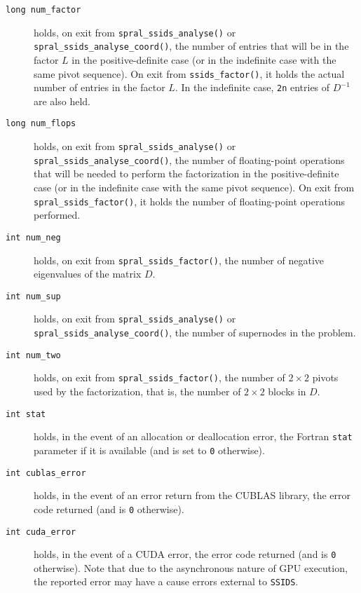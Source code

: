 \begin{description}
\item[\texttt{long num\_factor}] holds, on exit from
{\tt spral\_ssids\_analyse()}  or {\tt spral\_ssids\_analyse\_coord()},
the number of entries that will be in the
factor $L$ in the positive-definite case (or in the indefinite case with
the same pivot sequence). On exit from
{\tt ssids\_factor()},
it holds the actual number of entries in the factor
$L$. In the indefinite case, {\tt 2n} entries of ${D}^{-1}$ are
also held.

\item[\texttt{long num\_flops}] holds, on exit from
{\tt spral\_ssids\_analyse()}  or {\tt spral\_ssids\_analyse\_coord()},
the number of
floating-point operations that
will be needed to perform the factorization
in the positive-definite case (or in the indefinite case  with
the same pivot sequence).  On exit from {\tt spral\_ssids\_factor()}, it holds the
number of floating-point operations performed.

\item[\texttt{int num\_neg}] holds, on exit from {\tt spral\_ssids\_factor()},
the number of negative eigenvalues of the matrix $D$.


\item[\texttt{int num\_sup}] holds, on exit from {\tt spral\_ssids\_analyse()}  or {\tt spral\_ssids\_analyse\_coord()},
the number of supernodes in the problem.

\item[\texttt{int num\_two}] holds, on exit from
{\tt spral\_ssids\_factor()}, the number
of $2 \times 2$ pivots used by the factorization, that is,
the number of $2 \times 2$ blocks in $D$.

\item[\texttt{int stat}] holds, in the event of an allocation or deallocation
error, the Fortran {\tt stat} parameter if it is available
(and is set to {\tt 0} otherwise).

\item[\texttt{int cublas\_error}] holds, in the event of an error return from
the CUBLAS library, the error code returned (and is {\tt 0} otherwise).

\item[\texttt{int cuda\_error}] holds, in the event of a CUDA error, the error code
returned (and is {\tt 0} otherwise). Note that due to the asynchronous nature
of GPU execution, the reported error may have a cause errors external to
{\tt SSIDS}.

\end{description}



